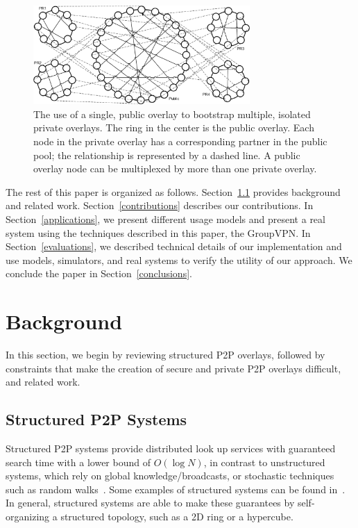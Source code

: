 \documentclass[conference]{IEEEtran}
\begin{document}
\begin{figure}[h]
\centering
\includegraphics[width=3.25in]{subrings.eps}
\caption{The use of a single, public overlay to bootstrap multiple, isolated
private overlays.  The ring in the center is the public overlay.  Each node in
the private overlay has a corresponding partner in the public pool; the
relationship is represented by a dashed line.  A public overlay node can be
multiplexed by more than one private overlay.}
\label{fig:subrings}
\end{figure}

The rest of this paper is organized as follows.  Section~\ref{structured_p2p}
provides background and related work.
Section~\ref{contributions} describes our contributions.  In
Section~\ref{applications}, we present different usage models and present a
real system using the techniques described in this paper, the GroupVPN.  In
Section~\ref{evaluations}, we described technical details of our implementation
and use models, simulators, and real systems to verify the utility of our
approach.  We conclude the paper in Section~\ref{conclusions}.

\section{Background}
\label{background}
In this section, we begin by reviewing structured P2P overlays, followed by
constraints that make the creation of secure and private P2P overlays
difficult, and related work.

\subsection{Structured P2P Systems}
\label{structured_p2p}
Structured P2P systems provide distributed look up services with guaranteed
search time with a lower bound of $O(\log N)$, in contrast to unstructured
systems, which rely on global knowledge/broadcasts, or stochastic techniques
such as random walks~\cite{unstructured_v_structured}.  Some examples of
structured systems can be found in~\cite{pastry, chord, symphony, kademlia,
can}.  In general, structured systems are able to make these guarantees by
self-organizing a structured topology, such as a 2D ring or a hypercube.
\end{document}
